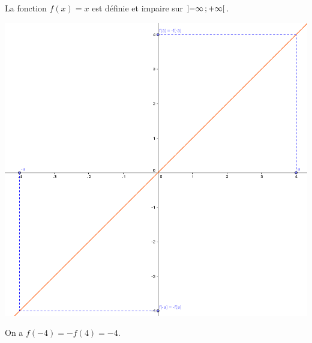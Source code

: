 	\begin{myex}
		La fonction $f(x) = x $  est définie et impaire sur $\mbox{\ensuremath{\left]- \infty\mathpunct{};+ \infty\right[}} $.
		
		\begin{center}
			\includegraphics[scale=0.4]{img/impaire}
		\end{center}
		
		On a $f(-4) = -f(4) = -4$.
	\end{myex}